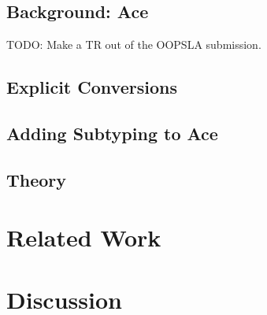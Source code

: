 \documentclass[10pt,preprint]{sigplanconf}
\theoremstyle{definition}
\begin{document}
\subsection{Background: Ace}
TODO: Make a TR out of the OOPSLA submission.
\subsection{Explicit Conversions}
\subsection{Adding Subtyping to Ace}
\subsection{Theory}

\section{Related Work}

\section{Discussion}






\end{document}
